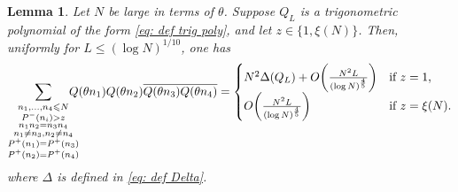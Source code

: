 \documentclass[12pt]{amsart}
\renewcommand{\leq}{\leqslant}
\numberwithin{equation}{section}
\theoremstyle{plain}
\newtheorem{lem}[thm]{Lemma}
\theoremstyle{definition}
\begin{document}
	\begin{lem}\label{lem:verif cond 2 thm A} Let $N$ be large in terms of $\theta$. Suppose $Q_L$ is a trigonometric polynomial of the form \eqref{eq: def trig poly}, and let $z \in \{1, \xi(N)\}$. Then, uniformly for $L \leq (\log N)^{1/10}$, one has
		\begin{align*}
			\sum_{\substack{n_1,\dots,n_4 \leq N \\ P^-(n_i) > z \\ n_1n_2=n_3n_4 \\ n_1 \ne n_3,n_2 \ne n_4 \\ P^+(n_1)=P^+(n_3) \\ P^+(n_2) = P^+(n_4)}} \hspace{-10pt} Q(\theta n_1)Q(\theta n_2)\overline{Q(\theta n_3)Q(\theta n_4)} = \begin{cases}
				N^2 \Delta(Q_L) + O\bigg(\frac{N^2L}{(\log N)^{\frac{4}{5}}}\bigg) & \text{if } z=1, \\
				O\bigg(\frac{N^2L}{(\log N)^{\frac{4}{5}}}\bigg) & \text{if } z=\xi(N).
			\end{cases}
		\end{align*}
		where $\Delta$ is defined in \eqref{eq: def Delta}.
	\end{lem}
\end{document}
